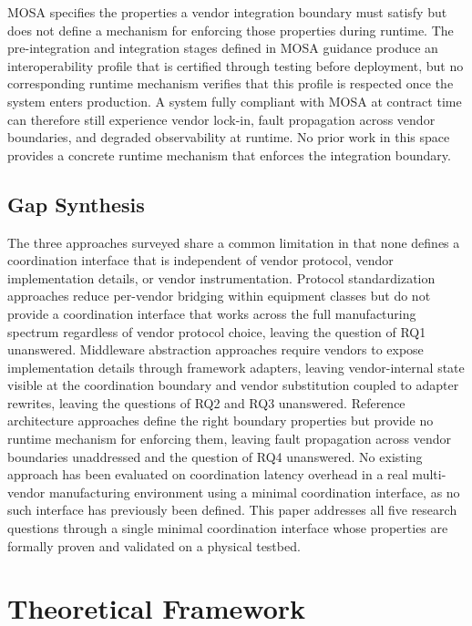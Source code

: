 \documentclass[a4paper,fleqn]{cas-dc}
\begin{document}
MOSA specifies the properties a vendor integration boundary must satisfy but does not define a mechanism for enforcing those properties during runtime. The pre-integration and integration stages defined in MOSA guidance produce an interoperability profile that is certified through testing before deployment, but no corresponding runtime mechanism verifies that this profile is respected once the system enters production. A system fully compliant with MOSA at contract time can therefore still experience vendor lock-in, fault propagation across vendor boundaries, and degraded observability at runtime. No prior work in this space provides a concrete runtime mechanism that enforces the integration boundary.

\subsection{Gap Synthesis}

The three approaches surveyed share a common limitation in that none defines a coordination interface that is independent of vendor protocol, vendor implementation details, or vendor instrumentation. Protocol standardization approaches reduce per-vendor bridging within equipment classes but do not provide a coordination interface that works across the full manufacturing spectrum regardless of vendor protocol choice, leaving the question of RQ1 unanswered. Middleware abstraction approaches require vendors to expose implementation details through framework adapters, leaving vendor-internal state visible at the coordination boundary and vendor substitution coupled to adapter rewrites, leaving the questions of RQ2 and RQ3 unanswered. Reference architecture approaches define the right boundary properties but provide no runtime mechanism for enforcing them, leaving fault propagation across vendor boundaries unaddressed and the question of RQ4 unanswered. No existing approach has been evaluated on coordination latency overhead in a real multi-vendor manufacturing environment using a minimal coordination interface, as no such interface has previously been defined. This paper addresses all five research questions through a single minimal coordination interface whose properties are formally proven and validated on a physical testbed.

\section{Theoretical Framework}
\label{sec:theory}
\end{document}
